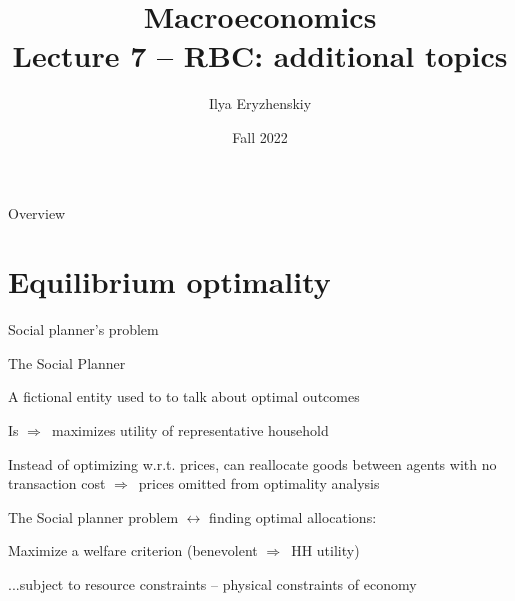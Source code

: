 \documentclass{beamer}
\title[PSME]{Macroeconomics\\ Lecture 7 -- RBC: additional topics}
\author[I. Eryzhenskiy]{Ilya Eryzhenskiy}
\institute[BdF]{PSME Panth\'{e}on-Sorbonne Master in Economics}
\date[PSME macro]{Fall 2022}
\newcommand{\tb}[1]{{\color{blue}{\textbf{#1}}}}
\newenvironment{mytemize}
{\vfill\itemize[nolistsep,itemsep=\fill,label=\color{blue}{$\triangleright$}]}
  {\enditemize}
\newcommand{\rarr}{$\Rightarrow$\ }
\begin{document}
\begin{frame}
  \maketitle
\end{frame}

\begin{frame}{Overview}
  \tableofcontents
\end{frame}

\section{Equilibrium optimality}
\begin{frame}{Social planner's problem}

\begin{mytemize}
\item The Social Planner
\begin{mytemize}
\item A fictional entity used to  to talk about optimal outcomes
\item Is \tb{benevolent} \rarr maximizes utility of representative household
\item Instead of optimizing w.r.t. prices, can reallocate goods between agents with no transaction cost 
  \rarr prices omitted from optimality analysis
\end{mytemize}
\item  The Social planner problem $\leftrightarrow$ finding optimal allocations:
\begin{mytemize}
\item Maximize a welfare criterion (benevolent \rarr HH utility)
\item ...subject to resource constraints -- physical constraints of economy
\end{mytemize}
\end{mytemize}


\end{frame}
\end{document}
